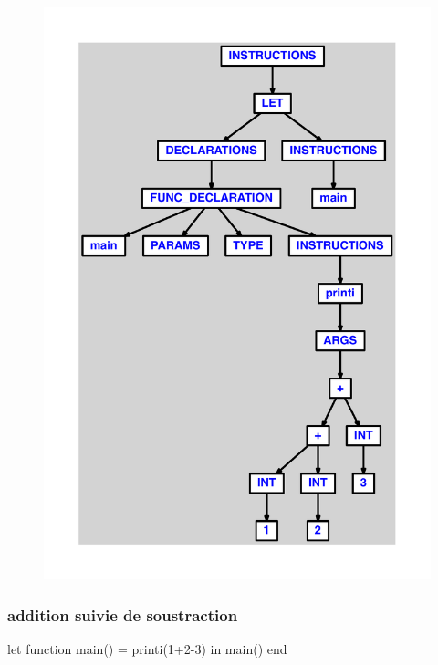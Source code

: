 \documentclass{article}
\begin{document}
\begin{figure}[H]\centering\includegraphics[max width=\textwidth]{ast/ast_43.pdf}\end{figure}\subsubsection{addition suivie de soustraction}
\begin{verbatimtab}
let
	function main() = printi(1+2-3)
in main() end
\end{verbatimtab}
\end{document}
